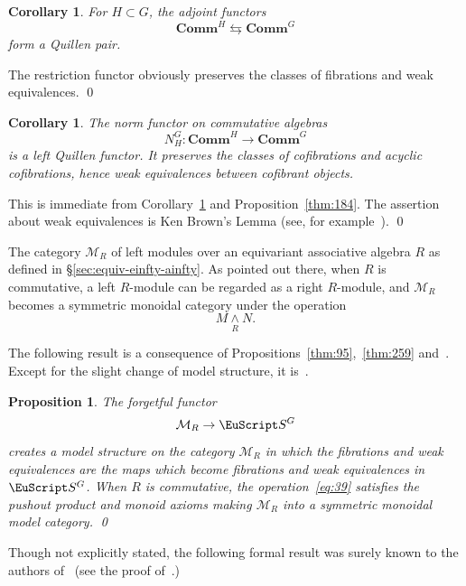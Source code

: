 \documentclass{amsart}
\newtheorem{cor}[equation]{Corollary}
\newtheorem{prop}[equation]{Proposition}
\theoremstyle{definition}
\theoremstyle{remark}
\newenvironment{pf}{\bigskip{\em Proof:\/}}{\qed\medskip}
\newcommand{\spectra}{\EuScript S}
\newcommand{\rmod}[1]{\mathcal M_{#1}}
\newcommand{\smashove}[1]{\underset{#1}{\wedge}}
\newcommand{\norm}{N}
\newcommand{\einftycat}{\mathbf{Comm}}
\newcommand{\ugeinftycat}[1]{\einftycat^{#1}}
\newcommand{\ugspectra}[1]{\spectra^{#1}}
\begin{document}
\begin{cor}
\label{thm:17}
For $H\subset G$, the adjoint functors 
\[
\ugeinftycat{H} \leftrightarrows \ugeinftycat{G}
\]
form a Quillen pair.
\end{cor}

\begin{pf}
The restriction functor obviously preserves the classes of fibrations
and weak equivalences.
\end{pf}

\begin{cor}
\label{thm:27}
The norm functor on commutative algebras
\[
\norm_{H}^{G}:\ugeinftycat{H}\to \ugeinftycat{G}
\]
is a left Quillen functor.  It preserves the classes of cofibrations
and acyclic cofibrations, hence weak equivalences between cofibrant
objects.
\end{cor}

\begin{pf}
This is immediate from Corollary~\ref{thm:17} and
Proposition~\ref{thm:184}.  The assertion about weak equivalences is
Ken Brown's Lemma (see, for example~\cite[Lemma
1.1.12]{hovey99:_model}).
\end{pf}

The category $\rmod{R}$ of left modules over an equivariant
associative algebra $R$ as defined in \S\ref{sec:equiv-einfty-ainfty}.
As pointed out there, when $R$ is commutative, a left $R$-module can
be regarded as a right $R$-module, and $\rmod{R}$ becomes a symmetric
monoidal category under the operation
\begin{equation}
\label{eq:39}
M\smashove{R} N.
\end{equation}

The following result is a consequence of
Propositions~\ref{thm:95},~\ref{thm:259}
and~\cite[Theorem~4.1]{MR1734325}.  Except for the slight change of
model structure, it is~\cite[Theorem III.7.6]{MR1922205}.

\begin{prop}
\label{thm:115} 
The forgetful functor 
\[
\rmod{R} \to \ugspectra{G}
\]
creates a model structure on the category $\rmod{R}$ in which the
fibrations and weak equivalences are the maps which become fibrations
and weak equivalences in $\ugspectra{G}$.  When $R$ is commutative, the
operation~\eqref{eq:39} satisfies the pushout product and monoid
axioms making $\rmod{R}$ into a symmetric monoidal model category. \qed
\end{prop}

Though not explicitly stated, the following formal result was surely
known to the authors of~\cite{MR1734325} (see the proof
of~\cite[Theorem~4.3]{MR1734325}.)
\end{document}
